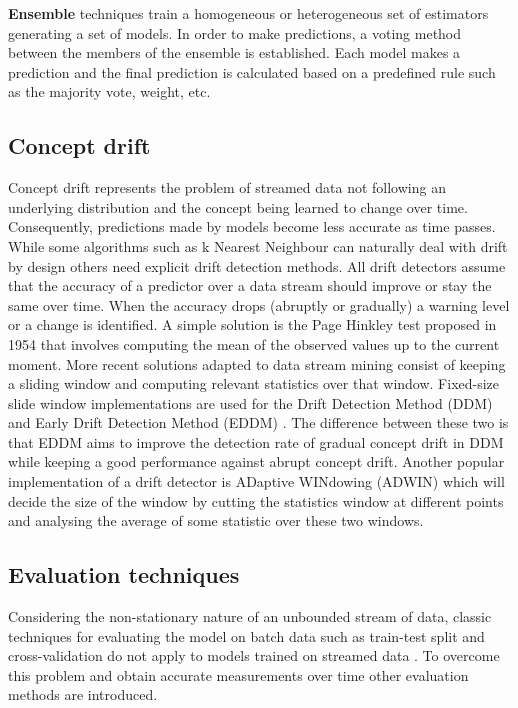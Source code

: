 \documentclass{sig-alternate-br}
\begin{document}
\textbf{Ensemble} techniques train a homogeneous \cite{bifet2012ensembles} or heterogeneous \cite{van2018online} set of estimators generating a set of models. In order to make predictions, a voting method between the members of the ensemble is established. Each model makes a prediction and the final prediction is calculated based on a predefined rule such as the majority vote, weight, etc.

\subsection{Concept drift}

Concept drift represents the problem of streamed data not following an underlying distribution and the concept being learned to change over time. Consequently, predictions made by models become less accurate as time passes. While some algorithms such as k Nearest Neighbour can naturally deal with drift by design \cite{van2016massively} others need explicit drift detection methods. All drift detectors assume that the accuracy of a predictor over a data stream should improve or stay the same over time. When the accuracy drops (abruptly or gradually) a warning level or a change is identified. A simple solution is the Page Hinkley test proposed in 1954 \cite{page1954continuous} that involves computing the mean of the observed values up to the current moment. More recent solutions adapted to data stream mining consist of keeping a sliding window and computing relevant statistics over that window. Fixed-size slide window implementations are used for the Drift Detection Method (DDM) \cite{gama2004learning} and Early Drift Detection Method (EDDM) \cite{baena2006early}. The difference between these two is that EDDM aims to improve the detection rate of gradual concept drift in DDM while keeping a good performance against abrupt concept drift. Another popular implementation of a drift detector is ADaptive WINdowing (ADWIN) \cite{bifet2007learning} which will decide the size of the window by cutting the statistics window at different points and analysing the average of some statistic over these two windows.

\vspace{0.5cm}

\subsection{Evaluation techniques}
\label{evaluation}

Considering the non-stationary nature of an unbounded stream of data, classic techniques for evaluating the model on batch data such as train-test split and cross-validation do not apply to models trained on streamed data \cite{gama2009issues}. To overcome this problem and obtain accurate measurements over time other evaluation methods are introduced.
\end{document}
